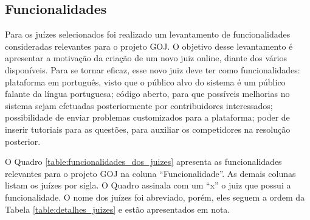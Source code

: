\subsection{Funcionalidades}
\label{subsec:funcionalidades}

Para os juízes selecionados foi realizado um levantamento de funcionalidades consideradas relevantes para o projeto GOJ. O objetivo desse levantamento é apresentar a motivação da criação de um novo juiz online, diante dos vários disponíveis. Para se tornar eficaz, esse novo juiz deve ter como funcionalidades: plataforma em português, visto que o público alvo do sistema é um público falante da língua portuguesa; código aberto, para que possíveis melhorias no sistema sejam efetuadas posteriormente por contribuidores interessados; possibilidade de enviar problemas customizados para a plataforma; poder de inserir tutoriais para as questões, para auxiliar os competidores na resolução posterior.

O Quadro \ref{table:funcionalidades_dos_juizes} apresenta as funcionalidades relevantes para o projeto GOJ na coluna ``Funcionalidade''. As demais colunas listam os juízes por sigla. O Quadro assinala com um ``x'' o juiz que possui a funcionalidade. O nome dos juízes foi abreviado, porém, eles seguem a ordem da Tabela \ref{table:detalhes_juizes} e estão apresentados em nota.


